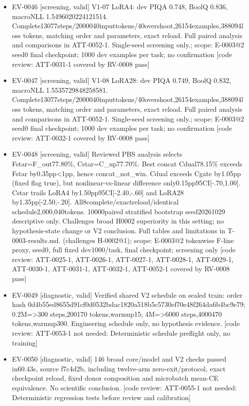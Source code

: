 \documentclass[11pt]{article}
\begin{document}
\begin{itemize}
\item EV-0046 [screening, valid] V1-07 LoRA4: dev PIQA 0.748, BoolQ 0.836, macroNLL 1.5496020224121514. Complete13077steps/2000040inputtokens/40overshoot,26154examples,388094loss tokens, matching order and parameters, exact reload. Full paired analysis and comparisons in ATT-0052-1. Single-seed screening only.; scope: E-0003@2 seed0 final checkpoint; 1000 dev examples per task; no confirmation [code review: ATT-0031-1 covered by RV-0008 pass]
\item EV-0047 [screening, valid] V1-08 LoRA28: dev PIQA 0.749, BoolQ 0.832, macroNLL 1.5535729848258581. Complete13077steps/2000040inputtokens/40overshoot,26154examples,388094loss tokens, matching order and parameters, exact reload. Full paired analysis and comparisons in ATT-0052-1. Single-seed screening only.; scope: E-0003@2 seed0 final checkpoint; 1000 dev examples per task; no confirmation [code review: ATT-0032-1 covered by RV-0008 pass]
\item EV-0048 [screening, valid] Reviewed PBS analysis selects Fstar=F\_out77.80\%, Cstar=C\_up77.70\%. Best concat Cdual78.15\% exceeds Fstar by0.35pp\textless{}1pp, hence concat\_not\_win. Cdual exceeds Cgate by1.05pp (fixed flag true), but nonlinear-vs-linear difference only0.15pp95CI[-.70,1.00]. Cstar trails LoRA4 by1.50pp95CI[-2.40,-.60] and LoRA28 by1.35pp[-2.50,-.20]. All8complete/exactreload/identical schedule2,000,040tokens. 10000paired stratified bootstrap seed20261029 descriptive only. Challenges broad H0002 superiority in this setting; no hypothesis-state change or V2 conclusion. Full tables and limitations in T-0003-results.md. (challenges H-0002@1); scope: E-0003@2 tokenwise F-line proxy, seed0, full fixed dev1000/task, final checkpoint; screening only [code review: ATT-0025-1, ATT-0026-1, ATT-0027-1, ATT-0028-1, ATT-0029-1, ATT-0030-1, ATT-0031-1, ATT-0032-1, ATT-0052-1 covered by RV-0008 pass]
\item EV-0049 [diagnostic, valid] Verified shared V2 schedule on sealed train: order hash 0d4b55ed8655d91cf0d0532bdac1820a518b5c5730ef70e48f264da6b4bc9e79; 0.2M=\textgreater{}300 steps,200170 tokens,warmup15; 4M=\textgreater{}6000 steps,4000470 tokens,warmup300. Engineering schedule only, no hypothesis evidence. [code review: ATT-0053-1 not needed: Deterministic schedule preflight only, no training]
\item EV-0050 [diagnostic, valid] 146 broad core/model and V2 checks passed in60.43s, source f7c4d2b, including twelve-arm zero-exit/protocol, exact checkpoint reload, fixed donor composition and microbatch mean-CE equivalence. No scientific conclusion. [code review: ATT-0055-1 not needed: Deterministic regression tests before review and calibration]

\end{itemize}
\end{document}
